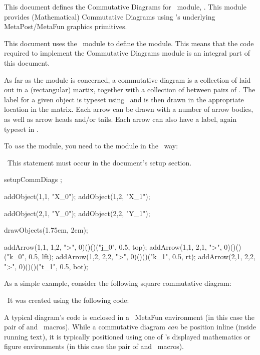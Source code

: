 
\startchapter[title=Overview]

This document defines the Commutative Diagrams for \ConTeXt\ module, 
. This module provides (Mathematical) Commutative 
Diagrams using \ConTeXt's underlying MetaPost/MetaFun graphics primitives. 

This document uses the  \ConTeXt\ module to 
define the  module. This means that the code required to 
implement the Commutative Diagrams module is an integral part of this document. 

As far as the  module is concerned, a commutative diagram 
is a collection of  laid out in a (rectangular) martix, 
together with a collection of  between pairs of 
. The label for a given object is typeset using \ConTeXt\ 
and is then drawn in the appropriate location in the matrix. Each arrow 
can be drawn with a number of arrow bodies, as well as arrow heads and/or 
tails. Each arrow can also have a label, again typeset in \ConTeXt. 

To \emph{use} the  module, you need to  the 
\type{t-commdiag} module in the \quote{usual} \ConTeXt\ way: 

\starttyping
\usemodule[t-commdiag]
\stoptyping

\noindent\ This \type{\usemodule} statement must occur in the document's 
setup section.

\startbuffer
\startformula {}  
  setupCommDiags ; 
  
  addObject(1,1, "X_0");
  addObject(1,2, "X_1");
  
  addObject(2,1, "Y_0");
  addObject(2,2, "Y_1");

  drawObjects(1.75cm, 2cm);

  addArrow(1,1, 1,2, ">", 0)()()("j_0",     0.5, top);
  addArrow(1,1, 2,1, ">", 0)()()("k_0",     0.5, lft);
  addArrow(1,2, 2,2, ">", 0)()()("k_1",     0.5, rt);
  addArrow(2,1, 2,2, ">", 0)()()("t_1",     0.5, bot);
\stopMPcode \stopformula
\stopbuffer

As a simple example, consider the following square commutative diagram: 
\processTEXbuffer

\noindent\ It was created using the following  code:

\typebuffer

A typical  diagram's code is enclosed in a \ConTeXt\ 
MetaFun environment (in this case the pair of \type{\startMPcode} and 
\type{\stopMPcode} \ConTeXt\ macros). While a \type{t-commdiag} 
commutative diagram \emph{can} be position inline (inside running text), 
it is typically positioned using one of \ConTeXt's displayed mathematics 
or figure environments (in this case the pair of \type{\startformula} and 
\type{\stopformula} \ConTeXt\ macros). 

